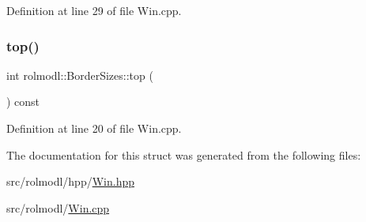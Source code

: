 Definition at line 29 of file Win.\+cpp.

\mbox{\label{structrolmodl_1_1_border_sizes_ad2daee506a395cd8e423242ba9c418f1}} 
\subsubsection{\texorpdfstring{top()}{top()}}
{\footnotesize\ttfamily int rolmodl\+::\+Border\+Sizes\+::top (\begin{DoxyParamCaption}{ }\end{DoxyParamCaption}) const\hspace{0.3cm}{\ttfamily [noexcept]}}



Definition at line 20 of file Win.\+cpp.



The documentation for this struct was generated from the following files\+:\begin{DoxyCompactItemize}
\item 
src/rolmodl/hpp/\mbox{\hyperlink{_win_8hpp}{Win.\+hpp}}\item 
src/rolmodl/\mbox{\hyperlink{_win_8cpp}{Win.\+cpp}}\end{DoxyCompactItemize}
